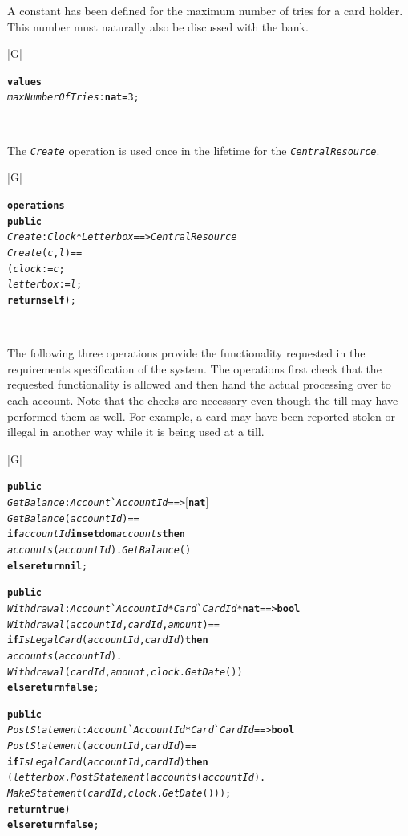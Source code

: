 \documentclass[\pformat,12pt,twoside]{article}
\newenvironment{VDMgray}%
{\begin{tabular}{|G|}\hline\small\begin{alltt}}%
{\end{alltt}\normalsize\\
 \hline\end{tabular}}
\begin{document}
A constant has been defined for the maximum number of tries for a card
holder. This number must naturally also be discussed with the bank.

\begin{VDMgray}
\textbf{values}
 \textit{maxNumberOfTries} : \textbf{nat} = 3;
\end{VDMgray}

The \texttt{\emph{Create}} operation is used once in the lifetime for
the \texttt{\emph{CentralResource}}.

\begin{VDMgray}
\textbf{operations}
 \textbf{public}
 \textit{Create} : \textit{Clock} * \textit{Letterbox} ==\texttt{>} \textit{CentralResource}
 \textit{Create}(\textit{c},\textit{l}) ==
   (\textit{clock} := \textit{c};
    \textit{letterbox} := \textit{l};
    \textbf{return} \textbf{self});
\end{VDMgray}


The following three operations provide the functionality requested 
in the requirements specification of the system. The operations 
first check that the requested functionality is allowed and then 
hand the actual processing over to each account. Note that the 
checks are necessary even though the till may have performed 
them as well. For example, a card may have been reported stolen 
or illegal in another way while it is being used at a till. 

\begin{VDMgray}
 \textbf{public}
 \textit{GetBalance} : \textit{Account}\`{}\textit{AccountId} ==\texttt{>} \ensuremath{[}\textbf{nat}\ensuremath{]}
 \textit{GetBalance}(\textit{accountId}) ==
   \textbf{if} \textit{accountId} \textbf{in set} \textbf{dom} \textit{accounts} \textbf{then}
      \textit{accounts}(\textit{accountId}).\textit{GetBalance}()
   \textbf{else}{\color{color16} \textbf{return nil}};

 \textbf{public}
 \textit{Withdrawal} : \textit{Account}\`{}\textit{AccountId} * \textit{Card}\`{}\textit{CardId} * \textbf{nat} ==\texttt{>} \textbf{bool}
 \textit{Withdrawal}(\textit{accountId},\textit{cardId},\textit{amount}) ==
   \textbf{if} \textit{IsLegalCard}(\textit{accountId},\textit{cardId}) \textbf{then}
      \textit{accounts}(\textit{accountId}).
         \textit{Withdrawal}(\textit{cardId},\textit{amount},\textit{clock}.\textit{GetDate}())
   \textbf{else}{\color{color16} \textbf{return}} {\color{color16} \textbf{false}};

 \textbf{public}
 \textit{PostStatement} : \textit{Account}\`{}\textit{AccountId} * \textit{Card}\`{}\textit{CardId} ==\texttt{>} \textbf{bool}
 \textit{PostStatement}(\textit{accountId},\textit{cardId}) ==
   \textbf{if} \textit{IsLegalCard}(\textit{accountId},\textit{cardId}) \textbf{then}
      (\textit{letterbox}.\textit{PostStatement}(\textit{accounts}(\textit{accountId}).
         \textit{MakeStatement}(\textit{cardId},\textit{clock}.\textit{GetDate}()));
       \textbf{return} \textbf{true})
   \textbf{else}{\color{color16} \textbf{return}} {\color{color16} \textbf{false}};
\end{VDMgray}
\end{document}
